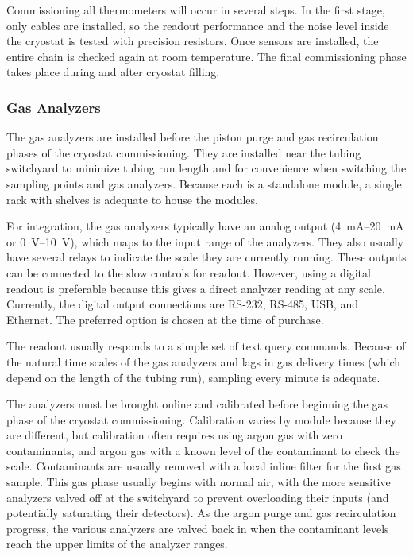 Commissioning all thermometers will occur in several steps. In the first stage, only cables %
are installed, so
the readout performance and the noise level inside the cryostat %
is tested with precision resistors. Once sensors are installed, the entire chain %
is checked again at room temperature.
The final commissioning phase %
takes place during and after cryostat filling.  


\subsubsection{Gas Analyzers}
\label{sec:fdgen-slow-cryo-install-ga}

The gas analyzers %
are installed before the piston purge and gas recirculation phases of the cryostat commissioning. They %
are installed near the tubing switchyard to minimize tubing run length and for convenience when switching the sampling points and gas analyzers. Because each is a standalone module, a single rack with shelves %
is adequate to house the modules.

For integration, the gas analyzers typically have an analog output (\SIrange{4}{20}{mA} or \SIrange{0}{10}{V}), which maps to the input range of the analyzers. They also usually have several relays to indicate the scale they are currently running. These outputs can be connected to the slow controls for readout. However, using a digital readout is preferable because this gives a direct analyzer reading at any scale. Currently, the digital output connections are RS-232, RS-485, USB, and Ethernet. The preferred option is chosen at the time of purchase. %

The readout usually responds to a simple set of text query commands. Because of the natural time scales of the gas analyzers and lags in gas delivery times (which depend on the length of the tubing run), sampling every minute is adequate.

The analyzers %
must be brought online and calibrated before beginning the gas phase of the cryostat commissioning.  Calibration varies by module because they are different, but calibration often requires using argon gas with zero contaminants, and argon gas with a known level of the contaminant to check the scale. Contaminants are usually removed with a local inline filter for the first gas sample. %
This gas phase usually begins with normal air, with the more sensitive analyzers valved off at the switchyard to prevent overloading their inputs (and potentially saturating their detectors). As the argon purge and gas recirculation progress, the various analyzers %
are valved back in when the contaminant levels reach the upper limits of the analyzer ranges. 

